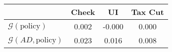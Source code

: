 \begin{tabular}{@{}lccc@{}} 
\toprule 
                          & Check      & UI    & Tax Cut    \\  \midrule 
$\mathcal{G}(\text{policy})$ & 0.002  & -0.000  & 0.000     \\ 
$\mathcal{G}(AD,\text{policy})$ & 0.023  & 0.016  & 0.008     \\ 
\end{tabular}  
